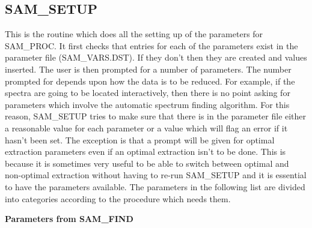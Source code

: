 \subsection{SAM\_SETUP} \label{sec:samsetup}

This is the routine which does all the setting up of the parameters for
SAM\_PROC.  It first checks that entries for each of the parameters exist in
the parameter file (SAM\_VARS.DST). If they don't then they are created and
values inserted.  The user is then prompted for a number of parameters.  The
number prompted for depends upon how the data is to be reduced.  For example,
if the spectra are going to be located interactively, then there is no point
asking for parameters which involve the automatic spectrum finding algorithm.
For this reason, SAM\_SETUP tries to make sure that there is in the parameter
file either a reasonable value for each parameter or a value which will flag
an error if it hasn't been set.  The exception is that a prompt will be given
for optimal extraction parameters even if an optimal extraction isn't to be
done.  This is because it is sometimes very useful to be able to switch
between optimal and non-optimal extraction without having to re-run SAM\_SETUP
and it is essential to have the parameters available. The parameters in the
following list are divided into categories according to the procedure which
needs them.

{\bf Parameters from SAM\_FIND}

